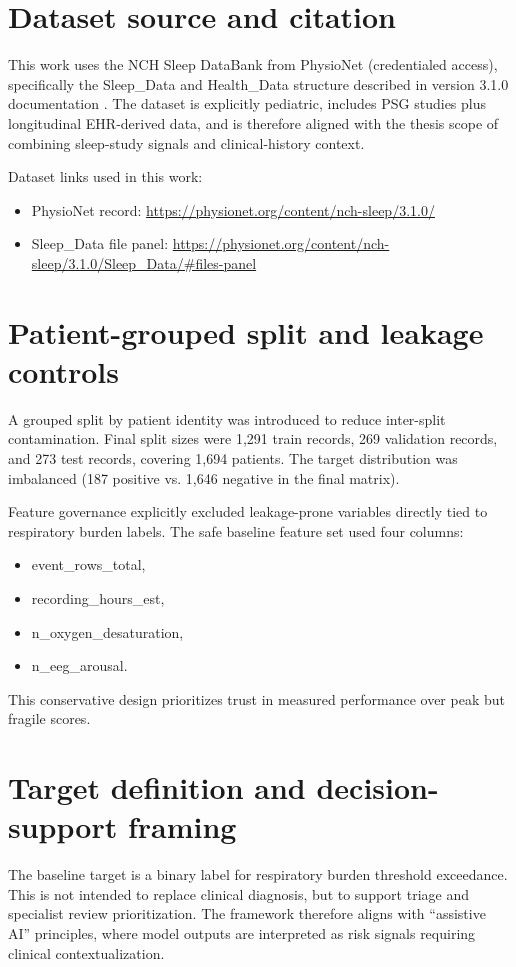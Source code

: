 \documentclass[10pt,a4paper,twocolumn]{article}
\begin{document}
\section{Dataset source and citation}
This work uses the NCH Sleep DataBank from PhysioNet (credentialed access), specifically the Sleep\_Data and Health\_Data structure described in version 3.1.0 documentation \citep{nchdatabankphysionet,lee2022scidata}. The dataset is explicitly pediatric, includes PSG studies plus longitudinal EHR-derived data, and is therefore aligned with the thesis scope of combining sleep-study signals and clinical-history context.

Dataset links used in this work:
\begin{itemize}[leftmargin=1.2cm]
    \item PhysioNet record: \url{https://physionet.org/content/nch-sleep/3.1.0/}
    \item Sleep\_Data file panel: \url{https://physionet.org/content/nch-sleep/3.1.0/Sleep_Data/#files-panel}
\end{itemize}

\section{Patient-grouped split and leakage controls}
A grouped split by patient identity was introduced to reduce inter-split contamination. Final split sizes were 1,291 train records, 269 validation records, and 273 test records, covering 1,694 patients. The target distribution was imbalanced (187 positive vs. 1,646 negative in the final matrix).

Feature governance explicitly excluded leakage-prone variables directly tied to respiratory burden labels. The safe baseline feature set used four columns:
\begin{itemize}[leftmargin=1.2cm]
    \item event\_rows\_total,
    \item recording\_hours\_est,
    \item n\_oxygen\_desaturation,
    \item n\_eeg\_arousal.
\end{itemize}

This conservative design prioritizes trust in measured performance over peak but fragile scores.

\section{Target definition and decision-support framing}
The baseline target is a binary label for respiratory burden threshold exceedance. This is not intended to replace clinical diagnosis, but to support triage and specialist review prioritization. The framework therefore aligns with ``assistive AI'' principles, where model outputs are interpreted as risk signals requiring clinical contextualization.
\end{document}
